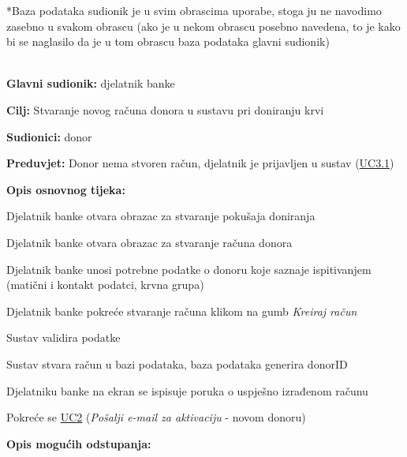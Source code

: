                 \par {
                    *Baza podataka sudionik je u svim obrascima uporabe, stoga ju ne navodimo zasebno u svakom obrascu (ako je u nekom obrascu posebno navedena, to je kako bi se naglasilo da je u tom obrascu baza podataka glavni sudionik)
                } \\ \\
					\noindent {} \label{UC1.1}
					\begin{packed_item}
	
						\item \textbf{Glavni sudionik: }djelatnik banke
						\item  \textbf{Cilj:} Stvaranje novog računa donora u sustavu pri doniranju krvi
						\item  \textbf{Sudionici:} donor
						\item  \textbf{Preduvjet:} Donor nema stvoren račun, djelatnik je prijavljen u sustav (\hyperref[UC3.1]{UC3.1})
						\item  \textbf{Opis osnovnog tijeka:}
						
						\item[] \begin{packed_enum}
							\item Djelatnik banke otvara obrazac za stvaranje pokušaja doniranja
							\item Djelatnik banke otvara obrazac za stvaranje računa donora
							\item Djelatnik banke unosi potrebne podatke o donoru koje saznaje ispitivanjem (matični i kontakt podatci, krvna grupa)
							\item Djelatnik banke pokreće stvaranje računa klikom na gumb \textit{Kreiraj račun}
							\item Sustav validira podatke
							\item Sustav stvara račun u bazi podataka, baza podataka generira donorID
							\item Djelatniku banke na ekran se ispisuje poruka o uspješno izrađenom računu
							\item Pokreće se \hyperref[UC2]{UC2} (\textit{Pošalji e-mail za aktivaciju} - novom donoru)
						\end{packed_enum}
						
						\item  \textbf{Opis mogućih odstupanja:}
						
						\item[] \begin{packed_item}
	

\end{packed_item}
\end{packed_item}
